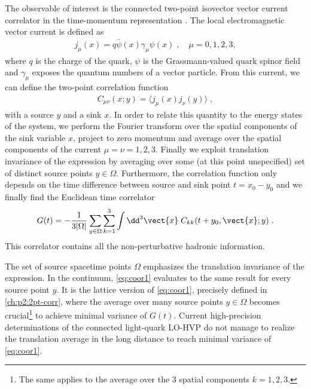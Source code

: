 The observable of interest is the connected two-point isovector vector current correlator in the time-momentum representation \cite{Bernecker:2011}.
The local electromagnetic vector current is defined as
\begin{align}
j_{\mu}(x) = q \bar{\psi}(x) \gamma_{\mu} \psi(x) \;,
\quad
\mu=0,1,2,3,
\end{align}
where $q$ is the charge of the quark, $\psi$ is the Grassmann-valued quark spinor field and $\gamma_{\mu}$ exposes the quantum numbers of a vector particle. From this current, we can define the two-point correlation function
\begin{align} \label{eq:C_corr_xy}
C_{\mu \nu}(x;y) = \langle j_{\mu}(x) j_{\nu}(y) \rangle \;,
\end{align}
with a source $y$ and a sink $x$.
In order to relate this quantity to the energy states of the system, we perform the Fourier transform over the spatial components of the sink variable $x$, project to zero momentum and average over the spatial components of the current $\mu=\nu = 1,2,3$.
Finally we exploit translation invariance of the expression by averaging over some (at this point unspecified) set of distinct source points $y \in \Omega$.
Furthermore, the correlation function only depends on the time difference between source and sink point $t = x_0 - y_0$ and we finally find the Euclidean time correlator
\begin{align} \label{eq:coor1}
G(t) = - \frac{1}{3 \lvert \Omega \rvert} \sum_{y \in \Omega} \sum_{k=1}^{3} \int \dd^3 \vect{x} \; C_{kk}(t+y_0, \vect{x}; y) \;.
\end{align}
This correlator contains all the non-perturbative hadronic information.

The set of source spacetime points $\Omega$ emphasizes the translation invariance of the expression.
In the continuum, \cref{eq:coor1} evaluates to the same result for every source point $y$.
It is the lattice version of \cref{eq:coor1}, precisely defined in \cref{ch:p2:2pt-corr}, where the average over many source points $y \in \Omega$ becomes crucial\footnote{The same applies to the average over the \num{3} spatial components $k=1,2,3$.} to achieve minimal variance of $G(t)$.
Current high-precision determinations of the connected light-quark LO-HVP do not manage to realize the translation average in the long distance to reach minimal variance of \cref{eq:coor1}.

